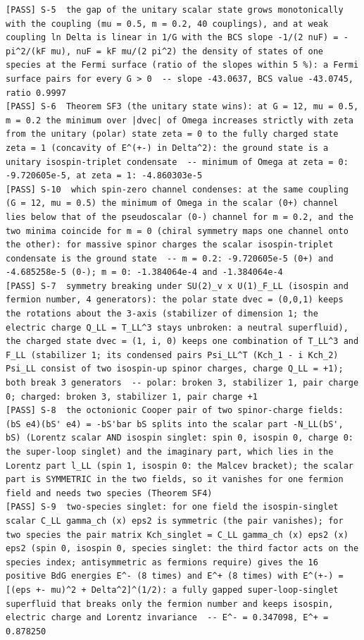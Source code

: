 \documentclass[
  10pt,
]{article}
\begin{document}
\begin{verbatim}
[PASS] S-5  the gap of the unitary scalar state grows monotonically with the coupling (mu = 0.5, m = 0.2, 40 couplings), and at weak coupling ln Delta is linear in 1/G with the BCS slope -1/(2 nuF) = -pi^2/(kF mu), nuF = kF mu/(2 pi^2) the density of states of one species at the Fermi surface (ratio of the slopes within 5 %): a Fermi surface pairs for every G > 0  -- slope -43.0637, BCS value -43.0745, ratio 0.9997
[PASS] S-6  Theorem SF3 (the unitary state wins): at G = 12, mu = 0.5, m = 0.2 the minimum over |dvec| of Omega increases strictly with zeta from the unitary (polar) state zeta = 0 to the fully charged state zeta = 1 (concavity of E^(+-) in Delta^2): the ground state is a unitary isospin-triplet condensate  -- minimum of Omega at zeta = 0: -9.720605e-5, at zeta = 1: -4.860303e-5
[PASS] S-10  which spin-zero channel condenses: at the same coupling (G = 12, mu = 0.5) the minimum of Omega in the scalar (0+) channel lies below that of the pseudoscalar (0-) channel for m = 0.2, and the two minima coincide for m = 0 (chiral symmetry maps one channel onto the other): for massive spinor charges the scalar isospin-triplet condensate is the ground state  -- m = 0.2: -9.720605e-5 (0+) and -4.685258e-5 (0-); m = 0: -1.384064e-4 and -1.384064e-4
[PASS] S-7  symmetry breaking under SU(2)_v x U(1)_F_LL (isospin and fermion number, 4 generators): the polar state dvec = (0,0,1) keeps the rotations about the 3-axis (stabilizer of dimension 1; the electric charge Q_LL = T_LL^3 stays unbroken: a neutral superfluid), the charged state dvec = (1, i, 0) keeps one combination of T_LL^3 and F_LL (stabilizer 1; its condensed pairs Psi_LL^T (Kch_1 - i Kch_2) Psi_LL consist of two isospin-up spinor charges, charge Q_LL = +1); both break 3 generators  -- polar: broken 3, stabilizer 1, pair charge 0; charged: broken 3, stabilizer 1, pair charge +1
[PASS] S-8  the octonionic Cooper pair of two spinor-charge fields: (bS e4)(bS' e4) = -bS'bar bS splits into the scalar part -N_LL(bS', bS) (Lorentz scalar AND isospin singlet: spin 0, isospin 0, charge 0: the super-loop singlet) and the imaginary part, which lies in the Lorentz part l_LL (spin 1, isospin 0: the Malcev bracket); the scalar part is SYMMETRIC in the two fields, so it vanishes for one fermion field and needs two species (Theorem SF4)
[PASS] S-9  two-species singlet: for one field the isospin-singlet scalar C_LL gamma_ch (x) eps2 is symmetric (the pair vanishes); for two species the pair matrix Kch_singlet = C_LL gamma_ch (x) eps2 (x) eps2 (spin 0, isospin 0, species singlet: the third factor acts on the species index; antisymmetric as fermions require) gives the 16 positive BdG energies E^- (8 times) and E^+ (8 times) with E^(+-) = [(eps +- mu)^2 + Delta^2]^(1/2): a fully gapped super-loop-singlet superfluid that breaks only the fermion number and keeps isospin, electric charge and Lorentz invariance  -- E^- = 0.347098, E^+ = 0.878250
\end{verbatim}
\end{document}
